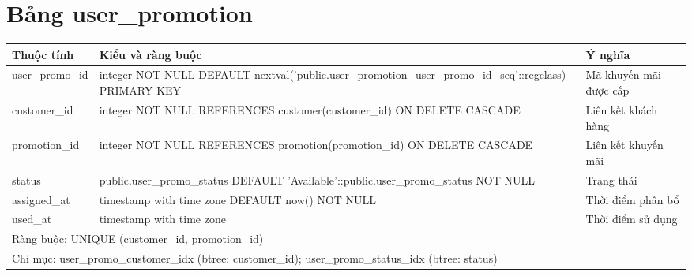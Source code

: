 \section{Bảng user\_promotion}
\begin{longtable}{|p{}|p{}|p{}|}\hline
\textbf{Thuộc tính}&\textbf{Kiểu và ràng buộc}&\textbf{Ý nghĩa}\\\hline\endhead
user\_promo\_id & integer NOT NULL DEFAULT nextval('public.user\_promotion\_user\_promo\_id\_seq'::regclass) PRIMARY KEY & Mã khuyến mãi được cấp\\\hline
customer\_id & integer NOT NULL REFERENCES customer(customer\_id) ON DELETE CASCADE & Liên kết khách hàng\\\hline
promotion\_id & integer NOT NULL REFERENCES promotion(promotion\_id) ON DELETE CASCADE & Liên kết khuyến mãi\\\hline
status & public.user\_promo\_status DEFAULT 'Available'::public.user\_promo\_status NOT NULL & Trạng thái\\\hline
assigned\_at & timestamp with time zone DEFAULT now() NOT NULL & Thời điểm phân bổ\\\hline
used\_at & timestamp with time zone & Thời điểm sử dụng\\\hline
\multicolumn{3}{|p{0.93\textwidth}|}{Ràng buộc: UNIQUE (customer\_id, promotion\_id)}\\\hline
\multicolumn{3}{|p{0.93\textwidth}|}{Chỉ mục: user\_promo\_customer\_idx (btree: customer\_id); user\_promo\_status\_idx (btree: status)}\\\hline
\end{longtable}
\normalsize
